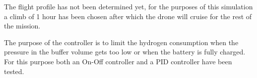The flight profile has not been determined yet, for the purposes of this simulation a climb of 1 hour has been chosen after which the drone will cruise for the rest of the mission.

The purpose of the controller is to limit the hydrogen consumption when the pressure in the buffer volume gets too low or when the battery is fully charged. For this purpose both an On-Off controller and a PID controller have been tested.

\newpage
